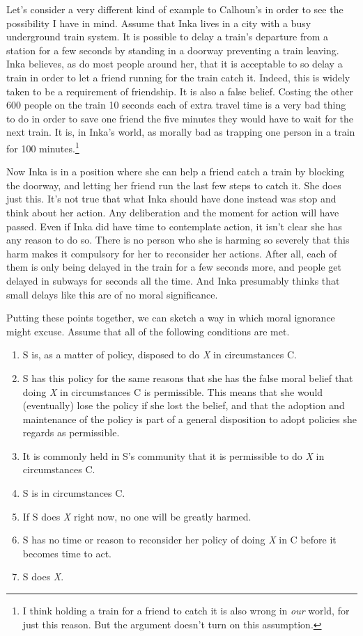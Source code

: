 \documentclass[
  10pt,
  letterpaper,
  twoside]{scrbook}
\providecommand{\tightlist}{%
  \setlength{\itemsep}{0pt}\setlength{\parskip}{0pt}}\usepackage{longtable,booktabs,array}
\begin{document}
Let's consider a very different kind of example to Calhoun's in order to
see the possibility I have in mind. Assume that {Inka} lives in a city
with a busy underground train system. It is possible to delay a train's
departure from a station for a few seconds by standing in a doorway
preventing a train leaving. {Inka} believes, as do most people around
her, that it is acceptable to so delay a train in order to let a friend
running for the train catch it. Indeed, this is widely taken to be a
requirement of friendship. It is also a false belief. Costing the other
600 people on the train 10 seconds each of extra travel time is a very
bad thing to do in order to save one friend the five minutes they would
have to wait for the next train. It is, in {Inka}'s world, as morally
bad as trapping one person in a train for 100 minutes.\footnote{I think
  holding a train for a friend to catch it is also wrong in \emph{our}
  world, for just this reason. But the argument doesn't turn on this
  assumption.}

Now {Inka} is in a position where she can help a friend catch a train by
blocking the doorway, and letting her friend run the last few steps to
catch it. She does just this. It's not true that what {Inka} should have
done instead was stop and think about her action. Any deliberation and
the moment for action will have passed. Even if {Inka} did have time to
contemplate action, it isn't clear she has any reason to do so. There is
no person who she is harming so severely that this harm makes it
compulsory for her to reconsider her actions. After all, each of them is
only being delayed in the train for a few seconds more, and people get
delayed in subways for seconds all the time. And {Inka} presumably
thinks that small delays like this are of no moral significance.

Putting these points together, we can sketch a way in which moral
ignorance might excuse. Assume that all of the following conditions are
met.

\begin{enumerate}
\def\labelenumi{\arabic{enumi}.}
\tightlist
\item
  S is, as a matter of policy, disposed to do \emph{X} in circumstances
  C.
\item
  S has this policy for the same reasons that she has the false moral
  belief that doing \emph{X} in circumstances C is permissible. This
  means that she would (eventually) lose the policy if she lost the
  belief, and that the adoption and maintenance of the policy is part of
  a general disposition to adopt policies she regards as permissible.
\item
  It is commonly held in S's community that it is permissible to do
  \emph{X} in circumstances C.
\item
  S is in circumstances C.
\item
  If S does \emph{X} right now, no one will be greatly harmed.
\item
  S has no time or reason to reconsider her policy of doing \emph{X} in
  C before it becomes time to act.
\item
  S does \emph{X}.
\end{enumerate}
\end{document}

